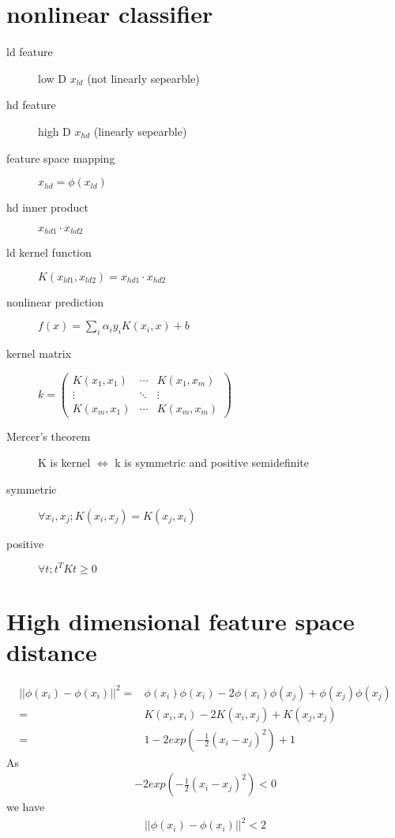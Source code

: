 \documentclass[12pt]{article}
\begin{document}
\begin{multicols}{2}
  \section{nonlinear classifier}
  \begin{description}
    \item[ld feature] low D $x_{ld}$ (not linearly sepearble)
    \item[hd feature] high D $x_{hd}$ (linearly sepearble)
    \item[feature space mapping] $x_{hd} = \phi(x_{ld})$
    \item[hd inner product] $x_{hd1} \cdot x_{hd2}$
    \item[ld kernel function] $K(x_{ld1}, x_{ld2}) = x_{hd1} \cdot x_{hd2}$
    \item[nonlinear prediction] $f(x) = \sum_{i} \alpha_i y_i K(x_i, x) + b$
    \item[kernel matrix]
      $k =
      \begin{pmatrix}
        K(x_1, x_1) & \cdots & K(x_1, x_m) \\
        \vdots & \ddots & \vdots \\
        K(x_m, x_1) & \cdots & K(x_m, x_m)
      \end{pmatrix}$
    \item[Mercer's theorem] K is kernel $\iff$ k is symmetric and positive semidefinite
      \item[symmetric] $\forall x_i, x_j; K(x_i,x_j) = K(x_j,x_i)$
      \item[positive] $\forall t; t^TKt \geq 0$
  \end{description}

  \section{High dimensional feature space distance}
  \begin{align*}
    ||\phi(x_i)-\phi(x_i)||^2
    =& \phi(x_i) \phi(x_i) - 2\phi(x_i) \phi(x_j) + \phi(x_j) \phi(x_j) \\
    =& K(x_i, x_i) -2 K(x_i, x_j) + K(x_j, x_j) \\
    =& 1 -2 exp(-\frac{1}{2} (x_i - x_j)^2) + 1
  \end{align*}
  As
  \begin{align*}
    -2 exp(-\frac{1}{2} (x_i - x_j)^2) < 0
  \end{align*}
  we have
  \begin{align*}
    ||\phi(x_i)-\phi(x_i)||^2 < 2
  \end{align*}

\end{multicols}
\end{document}
